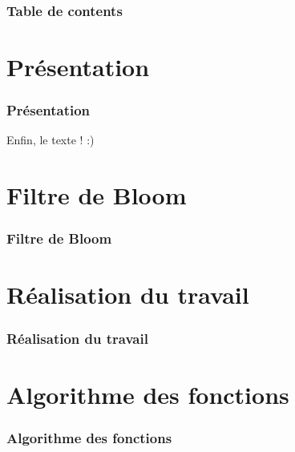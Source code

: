 \documentclass[hyperref={pdfpagemode=FullScreen,colorlinks=true},xcolor=pst,dvips]{beamer}\usepackage[french]{babel}
\title[]{\noindent\rule{\linewidth}{1pt}
		\large Recherche de filtres de Bloom similaires \\
		\large Application à la recherche par mots clés basée sur une DHT\\
		\noindent\rule{\linewidth}{1pt}
}
\author[NDOMBI TSHISUNGU \& DOAN]{\textbf{NDOMBI TSHISUNGU} Christian \& \textbf{DOAN} Cao Sang \\
			Encadrant: M. \textbf{MAKPANGOU} Mesaac, Regal}
\institute{UPMC}
\date{2 Mai 2015}
\begin{document}
	\begin{frame}
		\titlepage
	\end{frame}
	
	\begin{frame}
		\frametitle{Table de contents}
		\tableofcontents
	\end{frame}
	
	\section{Présentation}
	\begin{frame}
		\frametitle{Présentation}
		Enfin, le texte ! :)
	\end{frame}

	\section{Filtre de Bloom}
	\begin{frame}
		\frametitle{Filtre de Bloom}

	\end{frame}
	
	\section{Réalisation du travail}
	\begin{frame}
		\frametitle{Réalisation du travail}	
	
	\end{frame}
	
	\section{Algorithme des fonctions}
	\begin{frame}
		\frametitle{Algorithme des fonctions}
	\end{frame}
	
\end{document}
